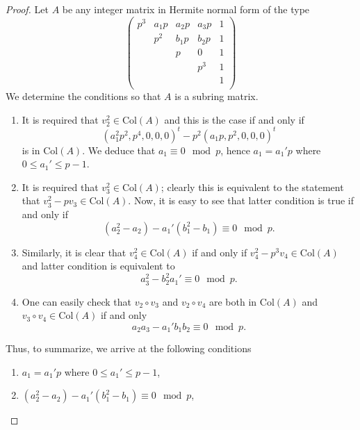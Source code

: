 \documentclass[a4paper]{amsart}
\numberwithin{equation}{section}
\theoremstyle{remark}
\renewcommand{\Col}{\mathrm{Col}}
\begin{document}
\begin{proof}
    Let $A$ be any integer matrix in Hermite normal form of the type
    $$
    \begin{pmatrix}
        p^3 & a_1p & a_2p & a_3p & 1\\
         & p^2 & b_1p & b_2p & 1\\
          & & p & 0 & 1\\
          &&& p^3 & 1\\
          &&&& 1\\
    \end{pmatrix}
    $$
    We determine the conditions so that $A$ is a subring matrix.
    \begin{enumerate}
        \item It is required that $v_2^2 \in \Col(A)$ and this is the case if and only if
        \[(a_1^2p^2, p^4, 0, 0, 0)^t - p^2(a_1p, p^2, 0, 0, 0)^t\]
        is in $\Col(A)$. We deduce that $a_1 \equiv 0 \mod p$, hence $a_1 = a_1'p$ where $0 \leq a_1' \leq p-1$.
        \item It is required that $v_3^2 \in \Col(A)$; clearly this is equivalent to the statement that $v_3^2 - pv_3 \in \Col(A)$. Now, it is easy to see that latter condition is true if and only if
        \begin{equation}\label{(3,2,1,3)1}
            (a_2^2 - a_2) - a_1'(b_1^2-b_1) \equiv 0 \mod p.
        \end{equation}
        \item Similarly, it is clear that $v_4^2 \in \Col(A)$ if and only if $v_4^2 - p^3v_4 \in \Col(A)$ and latter condition is equivalent to
        \begin{equation}\label{(3,2,1,3)2}
            a_3^2-b_2^2a_1' \equiv 0 \mod p.
        \end{equation}
        \item One can easily check that $v_2\circ v_3$ and $v_2\circ v_4$ are both in $\Col(A)$ and $v_3\circ v_4 \in \Col(A)$ if and only
        \begin{equation}\label{(3,2,1,3)3}
            a_2a_3-a_1'b_1b_2 \equiv 0 \mod p.
        \end{equation}
    \end{enumerate}
    Thus, to summarize, we arrive at the following conditions
    \begin{enumerate}
    \item $a_1 = a_1'p$ where $0 \leq a_1' \leq p-1$,
    \item $(a_2^2 - a_2) - a_1'(b_1^2-b_1) \equiv 0 \mod p$,

\end{enumerate}
\end{proof}
\end{document}
